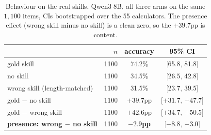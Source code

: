 \documentclass{article}
\begin{document}
\begin{table}[h]
\caption{Behaviour on the real skills, Qwen3-8B, all three arms on the same
$1{,}100$ items, CIs bootstrapped over the 55 calculators. The presence effect
(wrong skill minus no skill) is a clean zero, so the $+39.7$pp is content.}
\label{tab:behaviour}
\centering
\small
\begin{tabular}{lrcc}
\toprule
& $n$ & accuracy & 95\% CI \\
\midrule
gold skill                & 1100 & 74.2\% & [65.8, 81.8] \\
no skill                  & 1100 & 34.5\% & [26.5, 42.8] \\
wrong skill (length-matched) & 1100 & 31.5\% & [23.7, 39.5] \\
\midrule
gold $-$ no skill         & 1100 & $+39.7$pp & [$+31.7$, $+47.7$] \\
gold $-$ wrong skill      & 1100 & $+42.6$pp & [$+34.7$, $+50.5$] \\
\textbf{presence: wrong $-$ no skill} & 1100 & $\mathbf{-2.9}$\textbf{pp} & [$-8.8$, $+3.0$] \\
\bottomrule
\end{tabular}
\end{table}

\begin{table}[h]
\caption{The document-span transplant by layer. Qwen3-8B, 55 third-party
clinical skills, the $40$ rescued items, the full chain of thought decoded and
graded by the task's own scorer. The receiver is the with-skill prompt with the
document's tokens replaced by a filler document, so it is the same length and
every transplanted position keeps its rotary phase. Restricted, as everywhere in
this section, to the calculators the receiver never solves. This sweep used each
skill's paired control as the filler and the battery of \S\ref{sec:battery} the
single fixed one; over all forty items the three baselines agree to within
$0.01$ across the two ($0.175$/$0.025$/$0.950$ against $0.167$/$0.028$/$0.944$),
so the profile does not depend on that choice---the unrestricted version is
Table~\ref{tab:realspan-all}. The no-op arm---the receiver's own states written
back into the receiver---is reported wherever it was run and must equal the
receiver's baseline; it does, at every layer.}
\label{tab:realspandepth}
\centering
\small

\end{table}
\end{document}
